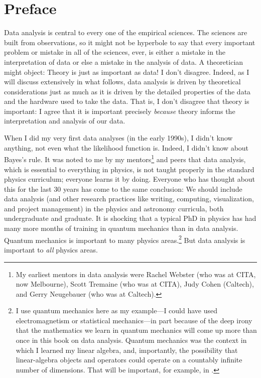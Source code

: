 
\chapter*{Preface}
Data analysis is central to every one of the empirical sciences.
The sciences are built from observations, so it might not be hyperbole to say that every important problem or mistake in all of the sciences, ever, is either a mistake in the interpretation of data or else a mistake in the analysis of data.
A theoretician might object: Theory is just as important as data!
I don't disagree.
Indeed, as I will discuss extensively in what follows, data analysis is driven by theoretical considerations just as much as it is driven by the detailed properties of the data and the hardware used to take the data.
That is, I don't disagree that theory is important:
I agree that it is important precisely \emph{because} theory informs the interpretation and analysis of our data.

When I did my very first data analyses (in the early 1990s), I didn't know anything, not even what the likelihood function is.
Indeed, I didn't know about Bayes's rule.
It was noted to me by my mentors\footnote{%
My earliest mentors in data analysis were Rachel Webster (who was at CITA, now Melbourne), Scott Tremaine (who was at CITA), Judy Cohen (Caltech), and Gerry Neugebauer (who was at Caltech).}
and peers that data analysis, which is essential to everything in physics, is not taught properly in the standard physics curriculum; everyone learns it by doing.
Everyone who has thought about this for the last 30 years has come to the same conclusion:
We should include data analysis (and other research practices like writing, computing, visualization, and project management) in the physics and astronomy curricula, both undergraduate and graduate.
It is shocking that a typical PhD in physics has had many more months of training in quantum mechanics than in data analysis.
Quantum mechanics is important to many physics areas.\footnote{%
I use quantum mechanics here as my example---I could have used electromagnetism or statistical mechanics---in part because of the deep irony that the mathematics we learn in quantum mechanics will come up more than once in this book on data analysis.
Quantum mechanics was the context in which I learned my linear algebra, and, importantly, the possibility that linear-algebra objects and operators could operate on a countably infinite number of dimensions.
That will be important, for example, in .}
But data analysis is important to \emph{all} physics areas.

